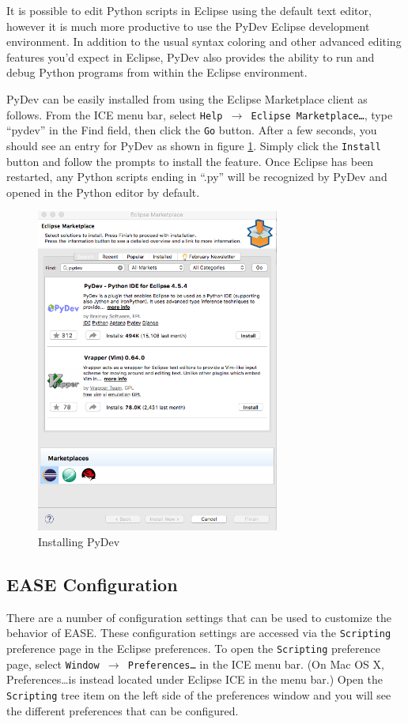 It is possible to edit Python scripts in Eclipse using the default text editor,
however it is much more productive to use the PyDev Eclipse development
environment. In addition to the usual syntax coloring and other advanced editing
features you'd expect in Eclipse, PyDev also provides the ability to run and
debug Python programs from within the Eclipse environment.

PyDev can be easily installed from using the Eclipse Marketplace client as
follows. From the ICE menu bar, select \texttt{Help $\rightarrow$ Eclipse
Marketplace\ldots}, type ``pydev'' in the Find field, then click the \texttt{Go}
button.
After a few seconds, you should see an entry for PyDev as shown in figure
\ref{fig:pydev}.
Simply click the \texttt{Install} button and follow the prompts to install the feature. Once
Eclipse has been restarted, any Python scripts ending in ``.py'' will be recognized by
PyDev and opened in the Python editor by default.

\begin{figure}[!ht]
\centering
\includegraphics[width=8cm]{images/pydev-marketplace}
\caption{Installing PyDev}
\label{fig:pydev}
\end{figure}

\subsection{EASE Configuration}

There are a number of configuration settings that can be used to customize the
behavior of EASE. These configuration settings are accessed via the \texttt{Scripting}
preference page in the Eclipse preferences. To open the \texttt{Scripting}
preference page, select \texttt{Window $\rightarrow$ Preferences\ldots} in the
ICE menu bar. (On Mac OS X, Preferences\ldots is instead located under Eclipse
ICE in the menu bar.) Open the \texttt{Scripting} tree item on the left side of
the preferences window and you will see the different preferences that can be
configured.

